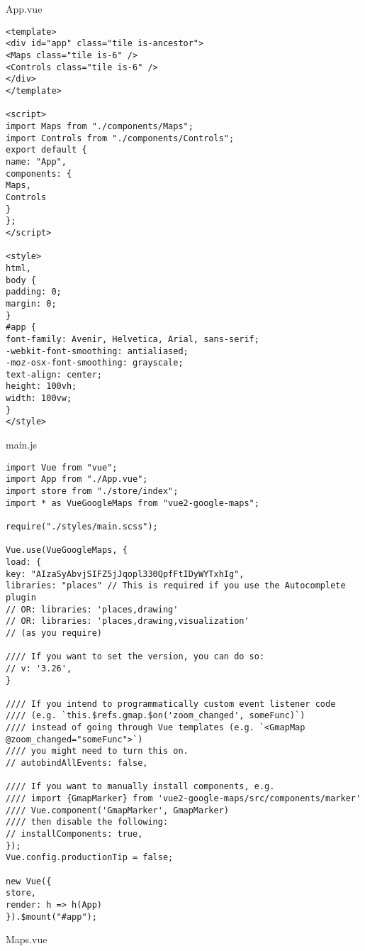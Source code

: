 \chapter{}
\label{ch:broncode_frontend}
App.vue
\begin{verbatim}
<template>
<div id="app" class="tile is-ancestor">
<Maps class="tile is-6" />
<Controls class="tile is-6" />
</div>
</template>

<script>
import Maps from "./components/Maps";
import Controls from "./components/Controls";
export default {
name: "App",
components: {
Maps,
Controls
}
};
</script>

<style>
html,
body {
padding: 0;
margin: 0;
}
#app {
font-family: Avenir, Helvetica, Arial, sans-serif;
-webkit-font-smoothing: antialiased;
-moz-osx-font-smoothing: grayscale;
text-align: center;
height: 100vh;
width: 100vw;
}
</style>
\end{verbatim}
main.js
\begin{verbatim}
import Vue from "vue";
import App from "./App.vue";
import store from "./store/index";
import * as VueGoogleMaps from "vue2-google-maps";

require("./styles/main.scss");

Vue.use(VueGoogleMaps, {
load: {
key: "AIzaSyAbvjSIFZ5jJqopl330QpfFtIDyWYTxhIg",
libraries: "places" // This is required if you use the Autocomplete plugin
// OR: libraries: 'places,drawing'
// OR: libraries: 'places,drawing,visualization'
// (as you require)

//// If you want to set the version, you can do so:
// v: '3.26',
}

//// If you intend to programmatically custom event listener code
//// (e.g. `this.$refs.gmap.$on('zoom_changed', someFunc)`)
//// instead of going through Vue templates (e.g. `<GmapMap @zoom_changed="someFunc">`)
//// you might need to turn this on.
// autobindAllEvents: false,

//// If you want to manually install components, e.g.
//// import {GmapMarker} from 'vue2-google-maps/src/components/marker'
//// Vue.component('GmapMarker', GmapMarker)
//// then disable the following:
// installComponents: true,
});
Vue.config.productionTip = false;

new Vue({
store,
render: h => h(App)
}).$mount("#app");
\end{verbatim}
Maps.vue
